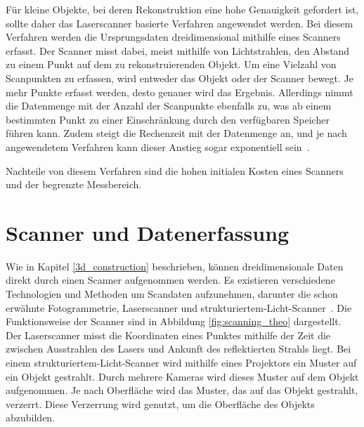 
Für kleine Objekte, bei deren Rekonstruktion eine hohe Genauigkeit gefordert ist, 
sollte daher das Laserscanner basierte Verfahren angewendet werden. Bei diesem Verfahren werden
die Ursprungsdaten dreidimensional mithilfe eines Scanners erfasst. Der Scanner misst dabei, 
meist mithilfe von Lichtstrahlen, den Abstand zu einem Punkt auf dem zu 
rekonstruierenden Objekt. Um eine Vielzahl von Scanpunkten zu erfassen, 
wird entweder das Objekt oder der Scanner bewegt. Je mehr Punkte erfasst werden, 
desto genauer wird das Ergebnis. Allerdings nimmt die Datenmenge mit der Anzahl der 
Scanpunkte ebenfalls zu, was ab einem bestimmten Punkt zu einer Einschränkung durch den 
verfügbaren Speicher führen kann. Zudem steigt die Rechenzeit mit der Datenmenge an, 
und je nach angewendetem Verfahren kann dieser Anstieg sogar 
exponentiell sein~\cite{XiaoleiDu.2009}.

Nachteile von diesem Verfahren sind die hohen initialen Kosten eines Scanners 
und der begrenzte Messbereich. 

\section{Scanner und Datenerfassung} \label{lasers}

Wie in Kapitel \ref{3d_construction} beschrieben, 
können dreidimensionale Daten direkt durch einen Scanner aufgenommen werden. 
Es existieren verschiedene Technologien und Methoden um Scandaten aufzunehmen, 
darunter die schon erwähnte Fotogrammetrie, Laserscanner und 
strukturiertem-Licht-Scanner~\cite{Ruiz.2022}. 
Die Funktionsweise der Scanner sind in Abbildung \ref{fig:scanning_theo} dargestellt.
Der Laserscanner misst die Koordinaten eines Punktes mithilfe der Zeit die zwischen 
Ausstrahlen des Lasers und Ankunft des reflektierten Strahls liegt.
Bei einem strukturiertem-Licht-Scanner wird mithilfe eines Projektors ein Muster 
auf ein Objekt gestrahlt. Durch mehrere Kameras wird dieses Muster auf dem Objekt 
aufgenommen. Je nach Oberfläche wird das Muster, das auf das Objekt gestrahlt, verzerrt.
Diese Verzerrung wird genutzt, um die Oberfläche des Objekts 
abzubilden.~\cite{georgopoulos2010assessing}

